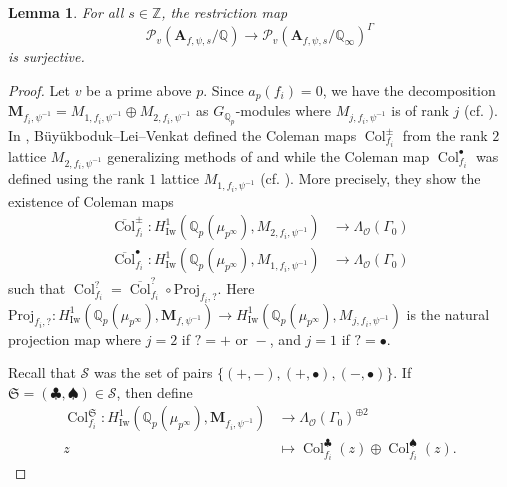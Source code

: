 \documentclass{amsart}
\newcommand{\HIw}{H^1_{\mathrm{Iw}}}
\newcommand{\Q}{\mathbb{Q}}
\newcommand{\Z}{\mathbb{Z}}
\newcommand{\fS}{\mathfrak{S}}
\newcommand{\bA}{\mathbf{A}}
\newcommand{\bM}{\mathbf{M}}
\newcommand{\col}{\operatorname{Col}}
\renewcommand{\O}{\mathcal{O}}
\newtheorem{auxiliary proposition}[theorem]{Auxiliary Proposition}
\newtheorem{lemma}[theorem]{Lemma}
\newtheorem{main conjecture}[theorem]{Main Conjecture}
\newtheorem{main theorem}[theorem]{Main Theorem}
\newtheorem{modesty proposition}[theorem]{Modesty Proposition}
\newtheorem{open problem}[theorem]{Open Problem}
\newtheorem{convergence lemma}[theorem]{Convergence Lemma}
\newtheorem{corrected lemma}[theorem]{Corrected Lemma}
\newtheorem{growth lemma}[theorem]{Growth Lemma}
\newtheorem{coefficient lemma}[theorem]{Integrality Lemma}
\newtheorem{interpolation lemma}[theorem]{Interpolation Lemma}
\newtheorem{kernel lemma}[theorem]{Kernel Lemma}
\newtheorem{limit lemma}[theorem]{Limit Lemma}
\newtheorem{tandem lemma}[theorem]{Modesty Lemma}
\newtheorem{zero-finding lemma}[theorem]{Zero-Finding Lemma}
\begin{document}
\begin{lemma}\label{lemma:second}
    For all $s\in \Z$, the restriction map $$\mathcal{P}_{v}(\bA_{f, \psi,s}/\Q ) \rightarrow \mathcal{P}_{v}(\bA_{f, \psi,s}/\Q_\infty)^\Gamma $$ is surjective.
\end{lemma}
\begin{proof}
Let $v$ be a prime above $p$. 
    Since $a_p(f_i)=0$, we have the decomposition
    $\bM_{f_i, \psi^{-1}} = M_{1,f_i, \psi^{-1}} \oplus M_{2,f_i, \psi^{-1}}$
    as $G_{\Q_p}$-modules where $M_{j,f_i, \psi^{-1}}$ is of rank $j$ (cf. \cite[Corollary 4.1.2]{BLV}). In \cite{BLV}, Büyükboduk--Lei--Venkat defined the Coleman maps $\col_{f_i}^\pm$ from the rank $2$ lattice $M_{2,f_i, \psi^{-1}}$ generalizing methods of \cite{leiloefflerzerbes11} and \cite{leiloefflerzerbes10} while the Coleman map $\col_{f_i}^\bullet$ was  defined using the  rank $1$ lattice $M_{1,f_i, \psi^{-1}}$ (cf. \cite[Lemma 4.1.5 and definition 4.2.1]{BLV}). More precisely, 
    they show the existence of Coleman maps
    \begin{align*}
        \overline{\col}^{\pm}_{f_i}: \HIw(\Q_p(\mu_{p^\infty}),M_{2, f_i, \psi^{-1}}) &\rightarrow \Lambda_{\O}(\Gamma_0)\\
        \overline{\col}^{\bullet}_{f_i}: \HIw(\Q_p(\mu_{p^\infty}),M_{1, f_i, \psi^{-1}}) &\rightarrow \Lambda_{\O}(\Gamma_0)
    \end{align*}
    such that $\col^?_{f_i} =  \overline{\col}^{?}_{f_i} \circ \mathrm{Proj}_{{f_i},?}. $
      Here $\mathrm{Proj}_{{f_i},?}:\HIw(\Q_p(\mu_{p^\infty}), \bM_{f, \psi^{-1}}) \rightarrow \HIw(\Q_p(\mu_{p^\infty}), M_{j,f_i, \psi^{-1}})$ is the natural projection map where $j=2$ if $?=+ \text{ or } -$, and $j=1$ if $?=\bullet$.

  Recall that $\mathcal{S}$ was the set of pairs $\{(+,-),(+,\bullet), (-,\bullet)\}.$ If $\fS = (\clubsuit, \spadesuit) \in \mathcal{S}$,
    then define
    \begin{align*}
       \col_{f_i}^{\fS}:\HIw(\Q_p(\mu_{p^\infty}), \bM_{f_i, \psi^{-1}}) &\rightarrow \Lambda_{\O}(\Gamma_0)^{\oplus 2} \\
       z &\mapsto \col_{f_i}^{\clubsuit} (z)\oplus \col_{f_i}^{\spadesuit} (z).
    \end{align*}
 

\end{proof}
\end{document}
